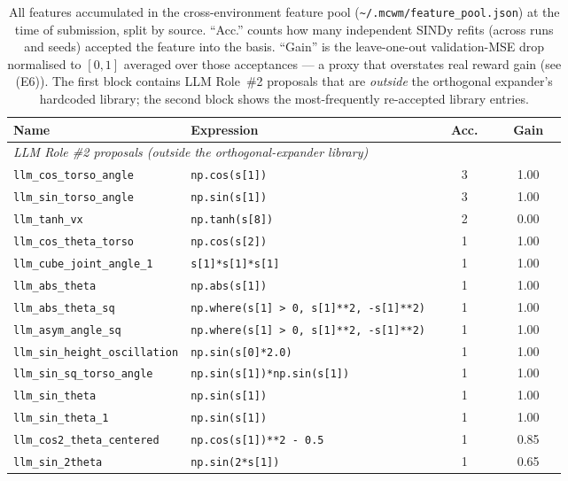 \documentclass{article}
\theoremstyle{definition}
\begin{document}
\begin{table}[h]
\caption{All features accumulated in the cross-environment
feature pool (\texttt{\textasciitilde/.mcwm/feature\_pool.json})
at the time of submission, split by source.  ``Acc.'' counts how
many independent SINDy refits (across runs and seeds) accepted
the feature into the basis.  ``Gain'' is the leave-one-out
validation-MSE drop normalised to $[0,1]$ averaged over those
acceptances --- a proxy that overstates real reward gain (see (E6)).
The first block contains LLM Role~\#2 proposals that are
\emph{outside} the orthogonal expander's hardcoded library;
the second block shows the most-frequently re-accepted library entries.}
\label{tab:role2-features}
\centering
\footnotesize
\begin{tabular}{p{0.32\linewidth}p{0.45\linewidth}cc}
\toprule
Name & Expression & Acc. & Gain \\
\midrule
\multicolumn{4}{l}{\emph{LLM Role \#2 proposals (outside the orthogonal-expander library)}} \\
\texttt{llm\_cos\_torso\_angle} & \texttt{np.cos(s[1])} & 3 & 1.00 \\
\texttt{llm\_sin\_torso\_angle} & \texttt{np.sin(s[1])} & 3 & 1.00 \\
\texttt{llm\_tanh\_vx} & \texttt{np.tanh(s[8])} & 2 & 0.00 \\
\texttt{llm\_cos\_theta\_torso} & \texttt{np.cos(s[2])} & 1 & 1.00 \\
\texttt{llm\_cube\_joint\_angle\_1} & \texttt{s[1]*s[1]*s[1]} & 1 & 1.00 \\
\texttt{llm\_abs\_theta} & \texttt{np.abs(s[1])} & 1 & 1.00 \\
\texttt{llm\_abs\_theta\_sq} & \texttt{np.where(s[1] > 0, s[1]**2, -s[1]**2)} & 1 & 1.00 \\
\texttt{llm\_asym\_angle\_sq} & \texttt{np.where(s[1] > 0, s[1]**2, -s[1]**2)} & 1 & 1.00 \\
\texttt{llm\_sin\_height\_oscillation} & \texttt{np.sin(s[0]*2.0)} & 1 & 1.00 \\
\texttt{llm\_sin\_sq\_torso\_angle} & \texttt{np.sin(s[1])*np.sin(s[1])} & 1 & 1.00 \\
\texttt{llm\_sin\_theta} & \texttt{np.sin(s[1])} & 1 & 1.00 \\
\texttt{llm\_sin\_theta\_1} & \texttt{np.sin(s[1])} & 1 & 1.00 \\
\texttt{llm\_cos2\_theta\_centered} & \texttt{np.cos(s[1])**2 - 0.5} & 1 & 0.85 \\
\texttt{llm\_sin\_2theta} & \texttt{np.sin(2*s[1])} & 1 & 0.65 \\

\end{tabular}
\end{table}
\end{document}
